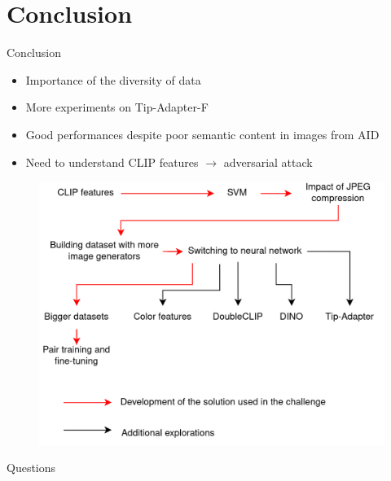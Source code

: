 \documentclass[11pt,compress]{beamer} %
\begin{document}
\section{Conclusion}
\begin{frame}{Conclusion}
  \begin{itemize}
    \pause
    \item Importance of the diversity of data
    \pause
    \item More experiments on Tip-Adapter-F
    \pause
    \item Good performances despite poor semantic content in images from AID
    \pause
    \item Need to understand CLIP features $\rightarrow$ adversarial attack
  \end{itemize}
  \pause
  \begin{figure}
    \includegraphics[width=.6\textwidth]{img/roadmap.png}
  \end{figure}
\end{frame}

\begin{frame}
  \centering
  Questions
\end{frame}
\end{document}

